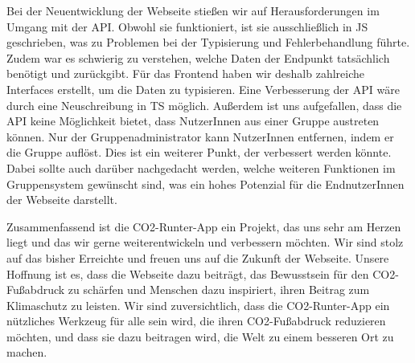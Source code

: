 Bei der Neuentwicklung der Webseite stießen wir auf Herausforderungen im Umgang mit der \acs{API}. Obwohl sie funktioniert, ist sie ausschließlich in \acl{JS} geschrieben, was zu Problemen bei der Typisierung und Fehlerbehandlung führte. Zudem war es schwierig zu verstehen, welche Daten der Endpunkt tatsächlich benötigt und zurückgibt. Für das Frontend haben wir deshalb zahlreiche Interfaces erstellt, um die Daten zu typisieren. Eine Verbesserung der \acs{API} wäre durch eine Neuschreibung in \acl{TS} möglich. Außerdem ist uns aufgefallen, dass die \acs{API} keine Möglichkeit bietet, dass NutzerInnen aus einer Gruppe austreten können. Nur der Gruppenadministrator kann NutzerInnen entfernen, indem er die Gruppe auflöst. Dies ist ein weiterer Punkt, der verbessert werden könnte. Dabei sollte auch darüber nachgedacht werden, welche weiteren Funktionen im Gruppensystem gewünscht sind, was ein hohes Potenzial für die EndnutzerInnen der Webseite darstellt.


Zusammenfassend ist die CO2-Runter-App ein Projekt, das uns sehr am Herzen liegt und das wir gerne weiterentwickeln und verbessern möchten. Wir sind stolz auf das bisher Erreichte und freuen uns auf die Zukunft der Webseite. Unsere Hoffnung ist es, dass die Webseite dazu beiträgt, das Bewusstsein für den CO2-Fußabdruck zu schärfen und Menschen dazu inspiriert, ihren Beitrag zum Klimaschutz zu leisten. Wir sind zuversichtlich, dass die CO2-Runter-App ein nützliches Werkzeug für alle sein wird, die ihren CO2-Fußabdruck reduzieren möchten, und dass sie dazu beitragen wird, die Welt zu einem besseren Ort zu machen.
